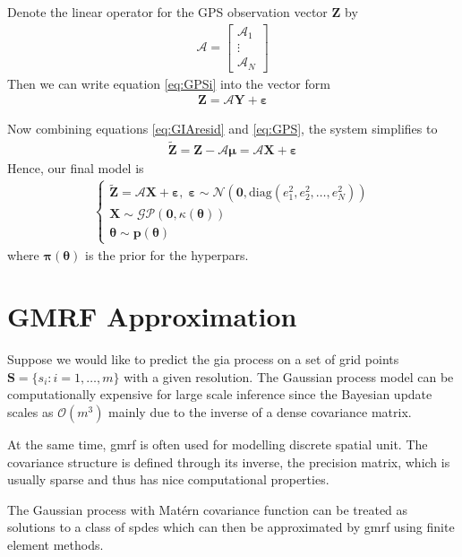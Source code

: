 \documentclass[a4paper,12pt]{article}
\begin{document}
Denote the linear operator for the GPS observation vector $\bm{Z}$ by 
\begin{align*}
\bm{\mathcal{A}} = \left[\begin{array}{c}
 \bm{\mathcal{A}}_1\\ \vdots \\ \bm{\mathcal{A}}_N \end{array} \right]
\end{align*}
Then we can write equation \ref{eq:GPSi} into the vector form
\begin{align}\label{eq:GPS}
\bm{Z} = \bm{\mathcal{A}}\bm{Y} + \bm{\varepsilon} 
\end{align}

Now combining equations \ref{eq:GIAresid} and \ref{eq:GPS}, the system simplifies to
\begin{align}
\bm{\tilde{Z}} = \bm{Z} - \bm{\mathcal{A}}\bm{\mu}= \bm{\mathcal{A}}\bm{X} + \bm{\varepsilon}
\end{align}
Hence, our final model is
\begin{align}
\left\{ \begin{array}{l}
\bm{\tilde{Z}} = \bm{\mathcal{A}}\bm{X} + \bm{\varepsilon}, \; 
\bm{\varepsilon} \sim \mathcal{N} (\bm{0}, \mbox{diag}(e_1^2, e_2^2, \dots, e_N^2)) \\
\bm{X} \sim \mathcal{GP}(\bm{0}, \kappa(\bm{\theta})) \\
\bm{\theta} \sim \bm{p}(\bm{\theta})
\end{array} \right.
\end{align}
where $\bm{\pi}(\bm{\theta})$ is the \gls{prior} for the \gls{hyperpars}.

\section{GMRF Approximation}
Suppose we would like to predict the \acrshort{gia} process on a set of grid points $\bm{S} = \{s_i: i = 1,\dots, m\}$ with a given resolution. The Gaussian process model can be computationally expensive for large scale inference since the Bayesian update scales as $\mathcal{O}(m^3)$ mainly due to the inverse of a dense covariance matrix. 

At the same time, \acrlong{gmrf} is often used for modelling discrete spatial unit. The covariance structure is defined through its inverse, the precision matrix, which is usually sparse and thus has nice computational properties.

The Gaussian process with Mat\'{e}rn covariance function can be treated as solutions to a class of \acrlong{spde}s \citep{Lindgren2011} which can then be approximated by \acrshort{gmrf} using finite element methods. 
\end{document}
